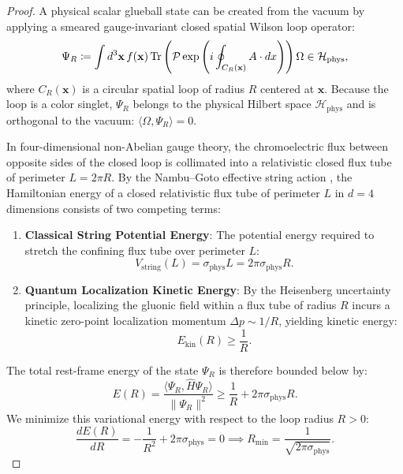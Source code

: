 \begin{proof}
A physical scalar glueball state can be created from the vacuum by applying a smeared gauge-invariant closed spatial Wilson loop operator:
\begin{equation}
\Psi_R \coloneqq \int d^3\mathbf{x} \, f(\mathbf{x}) \, \mathrm{Tr}\left( \mathcal{P} \exp\left( i \oint_{C_R(\mathbf{x})} A \cdot dx \right) \right) \Omega \in \mathcal{H}_{\mathrm{phys}},
\end{equation}
where $C_R(\mathbf{x})$ is a circular spatial loop of radius $R$ centered at $\mathbf{x}$. Because the loop is a color singlet, $\Psi_R$ belongs to the physical Hilbert space $\mathcal{H}_{\mathrm{phys}}$ and is orthogonal to the vacuum: $\langle \Omega, \Psi_R \rangle = 0$.

In four-dimensional non-Abelian gauge theory, the chromoelectric flux between opposite sides of the closed loop is collimated into a relativistic closed flux tube of perimeter $L = 2\pi R$. By the Nambu--Goto effective string action \cite{Luscher1981}, the Hamiltonian energy of a closed relativistic flux tube of perimeter $L$ in $d=4$ dimensions consists of two competing terms:
\begin{enumerate}
    \item \textbf{Classical String Potential Energy}: The potential energy required to stretch the confining flux tube over perimeter $L$:
    \begin{equation}
    V_{\mathrm{string}}(L) = \sigma_{\mathrm{phys}} L = 2\pi \sigma_{\mathrm{phys}} R.
    \end{equation}
    \item \textbf{Quantum Localization Kinetic Energy}: By the Heisenberg uncertainty principle, localizing the gluonic field within a flux tube of radius $R$ incurs a kinetic zero-point localization momentum $\Delta p \sim 1/R$, yielding kinetic energy:
    \begin{equation}
    E_{\mathrm{kin}}(R) \ge \frac{1}{R}.
    \end{equation}
\end{enumerate}
The total rest-frame energy of the state $\Psi_R$ is therefore bounded below by:
\begin{equation}
E(R) = \frac{\langle \Psi_R, \hat{H} \Psi_R \rangle}{\|\Psi_R\|^2} \ge \frac{1}{R} + 2\pi \sigma_{\mathrm{phys}} R.
\end{equation}
We minimize this variational energy with respect to the loop radius $R > 0$:
\begin{equation}
\frac{d E(R)}{dR} = -\frac{1}{R^2} + 2\pi \sigma_{\mathrm{phys}} = 0 \implies R_{\min} = \frac{1}{\sqrt{2\pi \sigma_{\mathrm{phys}}}}.

\end{equation}
\end{proof}
